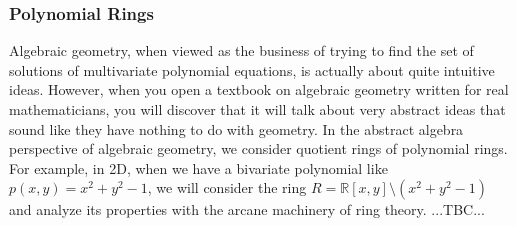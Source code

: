 \subsubsection{Polynomial Rings}
Algebraic geometry, when viewed as the business of trying to find the set of solutions of multivariate polynomial equations, is actually about quite intuitive ideas. However, when you open a textbook on algebraic geometry written for real mathematicians, you will discover that it will talk about very abstract ideas that sound like they have nothing to do with geometry. In the abstract algebra perspective of algebraic geometry, we consider quotient rings of polynomial rings. For example, in 2D, when we have a bivariate polynomial like $p(x,y) = x^2 + y^2 - 1$, we will consider the ring $R = \mathbb{R}[x,y] \setminus (x^2 + y^2 - 1)$ and analyze its properties with the arcane machinery of ring theory. ...TBC...


%
%

%





